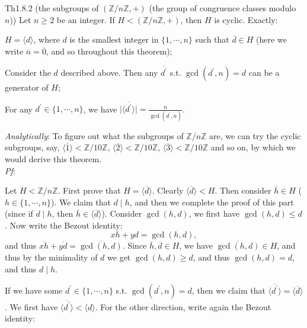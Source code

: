 \documentclass{article}
\begin{document}
\begin{Th}{Th1.8.2 (the subgroups of $(\mathbb{Z}/n\mathbb{Z}, +)$ (the group of congruence classes modulo $n$))}
    Let $n\geq 2$ be an integer. If $H<(\mathbb{Z}/n\mathbb{Z}, +)$, then $H$ is cyclic. Exactly:
    \begin{compactenum}
        \item $H = \langle d\rangle$, where $d$ is the smallest integer in $\{1, \cdots, n\}$ such that $\overline{d}\in H$ (here we write $\overline{n} = \overline{0}$, and so throughout this theorem);
        \item Consider the $d$ described above. Then any $\overline{d^\prime}$ s.t. $\gcd(d^\prime, n) = d$ can be a generator of $H$;
        \item For any $d^\prime\in\{1, \cdots, n\}$, we have
        $ \big|\langle \overline{d^\prime}\rangle\big| = \frac{n}{\gcd(d^\prime, n)} $.
    \end{compactenum}
    \tcblower
    \textcolor{P}{\textit{Analytically}: To figure out what the subgroups of $\mathbb{Z}/n\mathbb{Z}$ are, we can try the cyclic subgroups, say, $\langle \overline{1}\rangle < \mathbb{Z}/10\mathbb{Z}$, $\langle \overline{2}\rangle < \mathbb{Z}/10\mathbb{Z}$, $\langle \overline{3}\rangle < \mathbb{Z}/10\mathbb{Z}$ and so on, by which we would derive this theorem.} \\
    \textit{Pf}: 
    \begin{compactenum} 
        \item Let $H<\mathbb{Z}/n\mathbb{Z}$. First prove that $H = \langle \overline{d}\rangle$. Clearly $\langle \overline{d}\rangle < H$. Then consider $\overline{h}\in H$ ($h\in\{1,\cdots,n\}$). We claim that $d\mid h$, and then we complete the proof of this part (since if $d\mid h$, then $\overline{h}\in\langle\overline{d}\rangle$). Consider $\gcd(h, d)$, we first have $\gcd(h, d) \leq d$. Now write the Bezout identity:
        $$ xh + yd = \gcd(h, d), $$
        and thus $\overline{xh} + \overline{yd} = \overline{\gcd(h, d)} $. Since $\overline{h}, \overline{d}\in H$, we have $\overline{\gcd(h, d)}\in H$, and thus by the minimality of $d$ we get $\gcd(h, d) \geq d$, and thus $\gcd(h, d) = d$, and thus $d\mid h$.
        \item If we have some $d^\prime\in\{1,\cdots,n\}$ s.t. $\gcd(d^\prime, n) = d$, then we claim that $\langle \overline{d^\prime}\rangle = \langle \overline{d}\rangle$. We first have $\langle \overline{d^\prime}\rangle < \langle d \rangle$. For the other direction, write again the Bezout identity:

\end{compactenum}
\end{Th}
\end{document}
